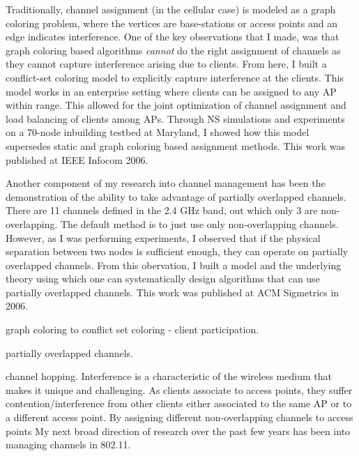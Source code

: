 \documentclass[11pt,letterpaper]{article}
\begin{document}
Traditionally, channel assignment (in the cellular case) is modeled as a graph coloring problem, where the vertices are
base-stations or access points and an edge indicates interference. One of the key observations that I made, was that
graph coloring based algorithms {\it cannot} do the right assignment of channels as they cannot capture interference
arising due to clients. From here, I built a conflict-set coloring model to explicitly capture interference at the
clients. This model works in an enterprise setting where clients can be assigned to any AP within range. This allowed
for the joint optimization of channel assignment and load balancing of clients among APs. Through NS simulations and
experiments on a 70-node inbuilding testbed at Maryland, I showed how this model supersedes static and graph coloring
based assignment methods. This work was published at IEEE Infocom 2006. 

Another component of my research into channel management has been the demonstration of the ability to take
advantage of partially overlapped channels. There are 11 channels defined in the 2.4 GHz band, out which only
3 are non-overlapping. The default method is to just use only non-overlapping channels. However, as I was performing
experiments, I observed that if the physical separation between two nodes is sufficient enough, they can operate on
partially overlapped channels. From this obervation, I built a model and the underlying theory using which one
can systematically design algorithms that can use partially overlapped channels. This work was published at 
ACM Sigmetrics in 2006.  
 
graph coloring to conflict set coloring - client participation.

partially overlapped channels.

channel hopping.
Interference is a characteristic of the wireless medium that makes it unique and challenging. As clients associate
to access points, they suffer contention/interference from other clients either associated to the same AP  
or to a different access point. By assigning different non-overlapping channels to access points
 My next broad direction
of research over the past few years has been into managing channels in 802.11. 
\end{document}
